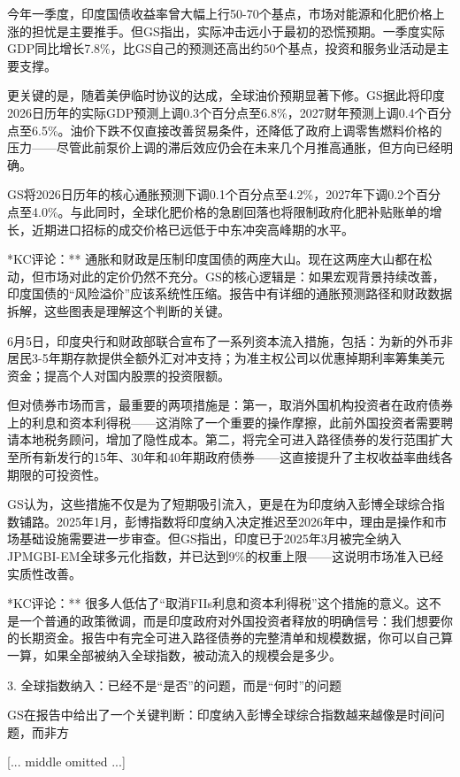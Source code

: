\documentclass[11pt]{ctexart}
\begin{document}
今年一季度，印度国债收益率曾大幅上行50-70个基点，市场对能源和化肥价格上涨的担忧是主要推手。但GS指出，实际冲击远小于最初的恐慌预期。一季度实际GDP同比增长7.8\%，比GS自己的预测还高出约50个基点，投资和服务业活动是主要支撑。

更关键的是，随着美伊临时协议的达成，全球油价预期显著下修。GS据此将印度2026日历年的实际GDP预测上调0.3个百分点至6.8\%，2027财年预测上调0.4个百分点至6.5\%。油价下跌不仅直接改善贸易条件，还降低了政府上调零售燃料价格的压力——尽管此前泵价上调的滞后效应仍会在未来几个月推高通胀，但方向已经明确。

GS将2026日历年的核心通胀预测下调0.1个百分点至4.2\%，2027年下调0.2个百分点至4.0\%。与此同时，全球化肥价格的急剧回落也将限制政府化肥补贴账单的增长，近期进口招标的成交价格已远低于中东冲突高峰期的水平。

*KC评论：** 通胀和财政是压制印度国债的两座大山。现在这两座大山都在松动，但市场对此的定价仍然不充分。GS的核心逻辑是：如果宏观背景持续改善，印度国债的“风险溢价”应该系统性压缩。报告中有详细的通胀预测路径和财政数据拆解，这些图表是理解这个判断的关键。

6月5日，印度央行和财政部联合宣布了一系列资本流入措施，包括：为新的外币非居民3-5年期存款提供全额外汇对冲支持；为准主权公司以优惠掉期利率筹集美元资金；提高个人对国内股票的投资限额。

但对债券市场而言，最重要的两项措施是：第一，取消外国机构投资者在政府债券上的利息和资本利得税——这消除了一个重要的操作摩擦，此前外国投资者需要聘请本地税务顾问，增加了隐性成本。第二，将完全可进入路径债券的发行范围扩大至所有新发行的15年、30年和40年期政府债券——这直接提升了主权收益率曲线各期限的可投资性。

GS认为，这些措施不仅是为了短期吸引流入，更是在为印度纳入彭博全球综合指数铺路。2025年1月，彭博指数将印度纳入决定推迟至2026年中，理由是操作和市场基础设施需要进一步审查。但GS指出，印度已于2025年3月被完全纳入JPMGBI-EM全球多元化指数，并已达到9\%的权重上限——这说明市场准入已经实质性改善。

*KC评论：** 很多人低估了“取消FIIs利息和资本利得税”这个措施的意义。这不是一个普通的政策微调，而是印度政府对外国投资者释放的明确信号：我们想要你的长期资金。报告中有完全可进入路径债券的完整清单和规模数据，你可以自己算一算，如果全部被纳入全球指数，被动流入的规模会是多少。

3. 全球指数纳入：已经不是“是否”的问题，而是“何时”的问题

GS在报告中给出了一个关键判断：印度纳入彭博全球综合指数越来越像是时间问题，而非方

[... middle omitted ...]
\end{document}
